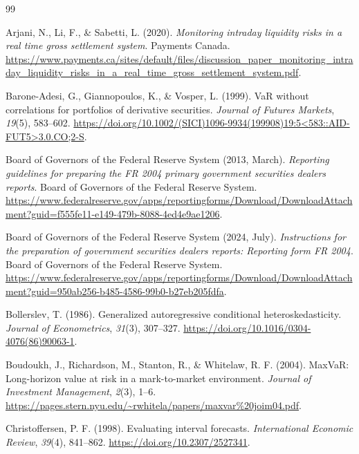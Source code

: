 \documentclass[11pt,a4paper]{article}
\begin{document}
\begin{thebibliography}{99}
\raggedright
{} Arjani, N., Li, F., \& Sabetti, L. (2020). \emph{Monitoring intraday liquidity risks in a real time gross settlement system}. Payments Canada. \url{https://www.payments.ca/sites/default/files/discussion_paper_monitoring_intraday_liquidity_risks_in_a_real_time_gross_settlement_system.pdf}.

 Barone-Adesi, G., Giannopoulos, K., \& Vosper, L. (1999). VaR without correlations for portfolios of derivative securities. \emph{Journal of Futures Markets}, \emph{19}(5), 583--602. \url{https://doi.org/10.1002/(SICI)1096-9934(199908)19:5<583::AID-FUT5>3.0.CO;2-S}.

 Board of Governors of the Federal Reserve System (2013, March). \emph{Reporting guidelines for preparing the FR 2004 primary government securities dealers reports}. Board of Governors of the Federal Reserve System. \url{https://www.federalreserve.gov/apps/reportingforms/Download/DownloadAttachment?guid=f555fe11-e149-479b-8088-4ed4e9ae1206}.

 Board of Governors of the Federal Reserve System (2024, July). \emph{Instructions for the preparation of government securities dealers reports: Reporting form FR 2004}. Board of Governors of the Federal Reserve System. \url{https://www.federalreserve.gov/apps/reportingforms/Download/DownloadAttachment?guid=950ab256-b485-4586-99b0-b27eb205fdfa}.

 Bollerslev, T. (1986). Generalized autoregressive conditional heteroskedasticity. \emph{Journal of Econometrics}, \emph{31}(3), 307--327. \url{https://doi.org/10.1016/0304-4076(86)90063-1}.

 Boudoukh, J., Richardson, M., Stanton, R., \& Whitelaw, R. F. (2004). MaxVaR: Long-horizon value at risk in a mark-to-market environment. \emph{Journal of Investment Management}, \emph{2}(3), 1--6. \url{https://pages.stern.nyu.edu/~rwhitela/papers/maxvar%20joim04.pdf}.

 Christoffersen, P. F. (1998). Evaluating interval forecasts. \emph{International Economic Review}, \emph{39}(4), 841--862. \url{https://doi.org/10.2307/2527341}.


\end{thebibliography}
\end{document}
